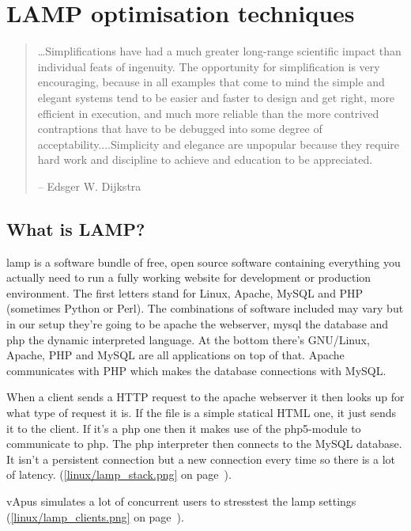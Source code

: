 \section{LAMP optimisation techniques}\label{sec:lamp_optimise}
\begin{quote}
	\ldots Simplifications have had a much greater long-range scientific impact than individual feats of
ingenuity. The opportunity for simplification is very encouraging, because in all examples that come to
mind the simple and elegant systems tend to be easier and faster to design and get right, more efficient in
execution, and much more reliable than the more contrived contraptions that have to be debugged into
some degree of acceptability....Simplicity and elegance are unpopular because they require hard work and
discipline to achieve and education to be appreciated.

-- Edsger W. Dijkstra
\end{quote}

\subsection{What is LAMP?}
\gls{lamp} is a software bundle of free, open source software containing everything you actually need to run a fully working website for development or production environment. 
The first letters stand for Linux, Apache, MySQL and PHP (sometimes Python or Perl). 
The combinations of software included may vary but in our setup they're going to be \gls{apache} the webserver, \gls{mysql} the database and \gls{php} the dynamic interpreted language.
At the bottom there's GNU/Linux, Apache, PHP and MySQL are all applications on top of that. Apache communicates with PHP which makes the database connections with MySQL.

When a client sends a HTTP request to the \gls{apache} webserver it then looks up for what type of request it is. If the file is a simple statical HTML one, it just sends it to the client.
If it's a \gls{php} one then it makes use of the php5-module to communicate to \gls{php}. The \gls{php} interpreter then connects to the MySQL database. 
It isn't a persistent connection but a new connection every time so there is a lot of latency.  (\autoref{linux/lamp_stack.png} on page~\pageref{linux/lamp_stack.png}).

vApus simulates a lot of concurrent users to stresstest the \gls{lamp} settings (\autoref{linux/lamp_clients.png} on page~\pageref{linux/lamp_clients.png}).
